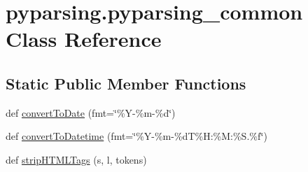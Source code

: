 \hypertarget{classpyparsing_1_1pyparsing__common}{}\section{pyparsing.\+pyparsing\+\_\+common Class Reference}
\label{classpyparsing_1_1pyparsing__common}
\subsection*{Static Public Member Functions}
\begin{DoxyCompactItemize}
\item 
def \hyperlink{classpyparsing_1_1pyparsing__common_abbfb7a4271749ae7b2bd5d52e0d878ca}{convert\+To\+Date} (fmt=\char`\"{}\%Y-\/\%m-\/\%d\char`\"{})
\item 
def \hyperlink{classpyparsing_1_1pyparsing__common_a59db5bf6d5234beeb9c76760bc81a106}{convert\+To\+Datetime} (fmt=\char`\"{}\%Y-\/\%m-\/\%dT\%H\+:\%M\+:\%S.\%f\char`\"{})
\item 
def \hyperlink{classpyparsing_1_1pyparsing__common_a46040ee63bdee362b047413db21def05}{strip\+H\+T\+M\+L\+Tags} (s, l, tokens)
\end{DoxyCompactItemize}
